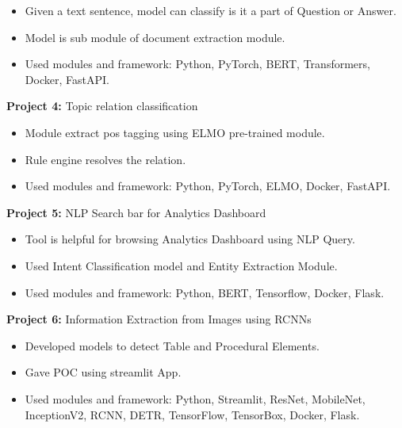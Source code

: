 \documentclass[letterpaper]{twentysecondcv} %
\begin{document}
\begin{twenty}
{\begin{itemize}
                        \item Given a text sentence, model can classify is it a part of Question or Answer.
                        \item Model is sub module of document extraction module.
                        \item Used modules and framework: Python, PyTorch, BERT, Transformers, Docker, FastAPI.
                    \end{itemize}
                \textbf{Project 4:} Topic relation classification
                    \begin{itemize}
                        \item Module extract pos tagging using ELMO pre-trained module. 
                        \item Rule engine resolves the relation.
                        \item Used modules and framework: Python, PyTorch, ELMO, Docker, FastAPI.
                    \end{itemize}
                \textbf{Project 5:} NLP Search bar for Analytics Dashboard
                    \begin{itemize}
                        \item Tool is helpful for browsing Analytics Dashboard using NLP Query.
                        \item Used Intent Classification model and Entity Extraction Module.
                        \item Used modules and framework: Python, BERT, Tensorflow, Docker, Flask.
                    \end{itemize}
                \textbf{Project 6:} Information Extraction from Images using RCNNs
                    \begin{itemize}
                        \item Developed models to detect Table and Procedural Elements.
                        \item Gave POC using streamlit App.
                        \item Used modules and framework: Python, Streamlit, ResNet, MobileNet, InceptionV2, RCNN, DETR, TensorFlow, TensorBox, Docker, Flask.
                    \end{itemize}
            }
    \end{twenty}
\end{document}
